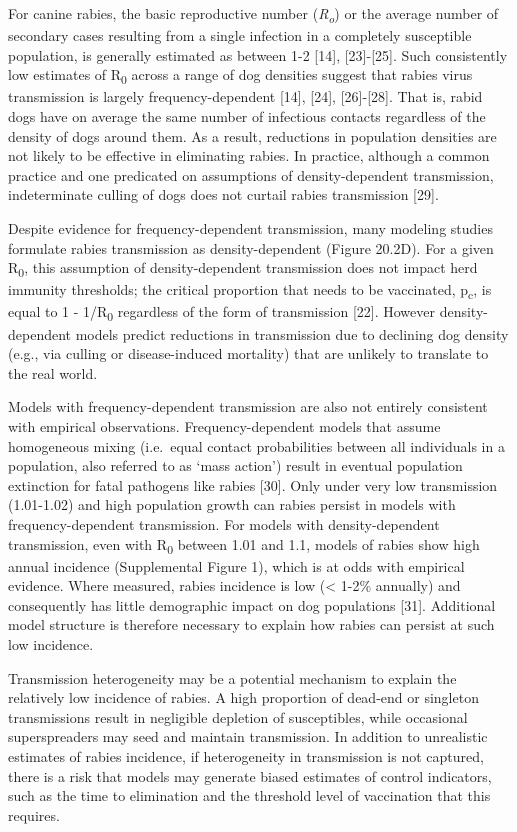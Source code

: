 \documentclass[
]{book}
\begin{document}
For canine rabies, the basic reproductive number (\emph{R\textsubscript{o}}) or the average
number of secondary cases resulting from a single infection in a
completely susceptible population, is generally estimated as between 1-2
{[}14{]}, {[}23{]}-{[}25{]}. Such consistently low estimates of R\textsubscript{0} across a
range of dog densities suggest that rabies virus transmission is largely
frequency-dependent {[}14{]}, {[}24{]}, {[}26{]}-{[}28{]}. That is, rabid dogs
have on average the same number of infectious contacts regardless of the
density of dogs around them. As a result, reductions in population
densities are not likely to be effective in eliminating rabies. In
practice, although a common practice and one predicated on assumptions
of density-dependent transmission, indeterminate culling of dogs does
not curtail rabies transmission {[}29{]}.

Despite evidence for frequency-dependent transmission, many modeling
studies formulate rabies transmission as density-dependent (Figure
20.2D). For a given R\textsubscript{0}, this assumption of density-dependent
transmission does not impact herd immunity thresholds; the critical
proportion that needs to be vaccinated, p\textsubscript{c}, is equal to 1 - 1/R\textsubscript{0}
regardless of the form of transmission {[}22{]}. However density-dependent
models predict reductions in transmission due to declining dog density
(e.g., via culling or disease-induced mortality) that are unlikely to
translate to the real world.

Models with frequency-dependent transmission are also not entirely
consistent with empirical observations. Frequency-dependent models that
assume homogeneous mixing (i.e.~equal contact probabilities between all
individuals in a population, also referred to as `mass action') result
in eventual population extinction for fatal pathogens like rabies
{[}30{]}. Only under very low transmission (1.01-1.02) and high population
growth can rabies persist in models with frequency-dependent
transmission. For models with density-dependent transmission, even with
R\textsubscript{0} between 1.01 and 1.1, models of rabies show high annual incidence
(Supplemental Figure 1), which is at odds with empirical evidence. Where
measured, rabies incidence is low (\textless{} 1-2\% annually) and consequently
has little demographic impact on dog populations {[}31{]}. Additional
model structure is therefore necessary to explain how rabies can persist
at such low incidence.

Transmission heterogeneity may be a potential mechanism to explain the
relatively low incidence of rabies. A high proportion of dead-end or
singleton transmissions result in negligible depletion of susceptibles,
while occasional superspreaders may seed and maintain transmission. In
addition to unrealistic estimates of rabies incidence, if heterogeneity
in transmission is not captured, there is a risk that models may
generate biased estimates of control indicators, such as the time to
elimination and the threshold level of vaccination that this requires.
\end{document}
